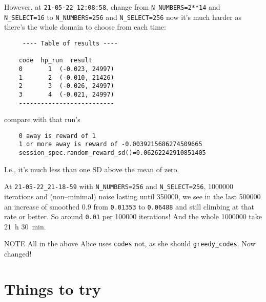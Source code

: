 \documentclass[12pt]{article}
\begin{document}
However, at \verb|21-05-22_12:08:58|, change from \verb|N_NUMBERS=2**14| and \verb|N_SELECT=16| to \verb|N_NUMBERS=256| and \verb|N_SELECT=256| now it's much harder as there's the whole domain to choose from each time:
\begin{lstlisting}
	 ---- Table of results ----
	
	code  hp_run  result
	0       1  (-0.023, 24997)
	1       2  (-0.010, 21426)
	2       3  (-0.026, 24997)
	3       4  (-0.021, 24997)
	--------------------------
\end{lstlisting}
compare with that run's
\begin{lstlisting}
	0 away is reward of 1
	1 or more away is reward of -0.0039215686274509665
	session_spec.random_reward_sd()=0.06262242910851405
\end{lstlisting}
I.e., it's much less than one SD above the mean of zero.

At \verb|21-05-22_21-18-59| with \verb|N_NUMBERS=256| and \verb|N_SELECT=256|, \num{1000000} iterations and (non--minimal) noise lasting until \num{350000}, we see in the last \num{500000} an increase of smoothed 0.9 from \verb|0.01353| to \verb|0.06488| and still climbing at that rate or better.  So around \verb|0.01| per \num{100000} iterations!  And the whole \num{1000000} take \SI{21}{h} \SI{30}{min}.

NOTE All in the above Alice uses \verb|codes| not, as she should \verb|greedy_codes|.  Now changed!

\section{Things to try}
\end{document}
